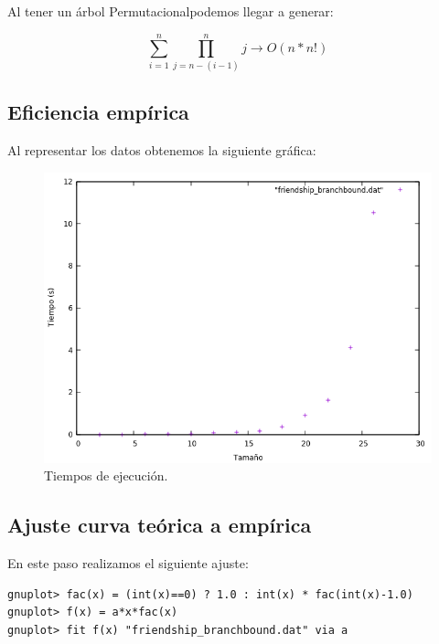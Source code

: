 Al tener un árbol Permutacionalpodemos llegar a generar:
 
  \begin{equation}
      \sum_{i=1}^{n} \prod_{j = n-(i-1)}^{n} j \rightarrow O(n*n!)
  \end{equation}

 
\subsection{Eficiencia empírica}

Al representar los datos obtenemos la siguiente gráfica:

\begin{figure}[H]
    \begin{center}
        \includegraphics[scale=0.7]{imagenes/bb.png}
        \caption{Tiempos de ejecución.}
        \label{fig2}
    \end{center}
\end{figure}

\subsection{Ajuste curva teórica a empírica}

En este paso realizamos el siguiente ajuste:
\begin{shaded*}
\begin{verbatim}
gnuplot> fac(x) = (int(x)==0) ? 1.0 : int(x) * fac(int(x)-1.0)
gnuplot> f(x) = a*x*fac(x)
gnuplot> fit f(x) "friendship_branchbound.dat" via a

\end{verbatim}
\end{shaded*}

